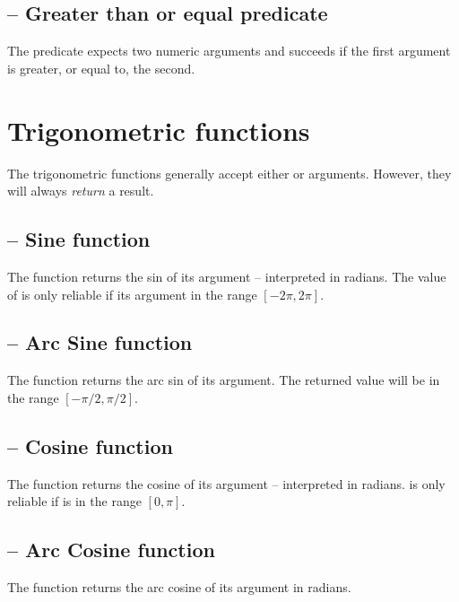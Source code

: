 \subsection{\function{>=} -- Greater than or equal predicate}
The \function{>=} predicate expects two numeric arguments and succeeds if the first argument is greater, or equal to, the second.
 
\section{Trigonometric functions}
\label{arith:trig}
The trigonometric functions generally accept either  or  arguments. However, they will always \emph{return} a  result.

\subsection{ -- Sine function}
\label{arith:sin}
The  function returns the sin of its argument -- interpreted in radians. The value of  is only reliable if its argument in the range $[-2\pi,2\pi]$.

\subsection{ -- Arc Sine function}
\label{arith:asin}
The  function returns the arc sin of its argument. The returned value will be in the range $[-\pi/2,\pi/2]$.
 
\subsection{ -- Cosine function}
\label{arith:cos}
     
The  function returns the cosine of its argument -- interpreted in radians.  is only reliable if  is in the range $[0,\pi]$.

\subsection{ -- Arc Cosine function}
\label{arith:acos}
The  function returns the arc cosine of its argument in radians. 

